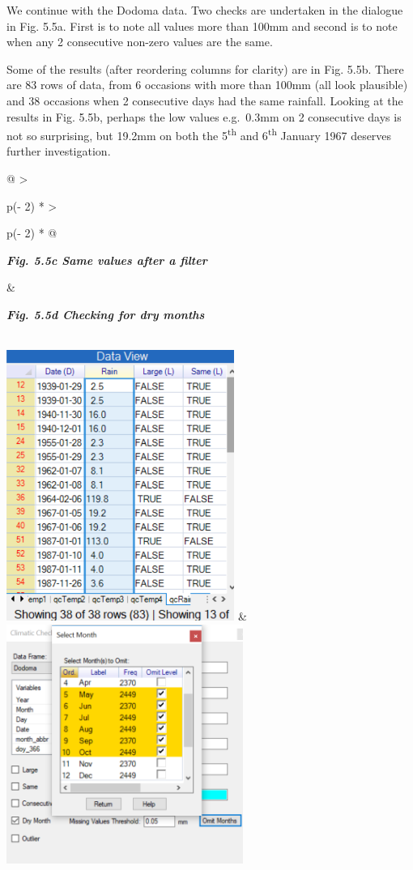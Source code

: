 \documentclass[
  letterpaper,
  DIV=11,
  numbers=noendperiod]{scrreprt}
\begin{document}
We continue with the Dodoma data. Two checks are undertaken in the
dialogue in Fig. 5.5a. First is to note all values more than 100mm and
second is to note when any 2 consecutive non-zero values are the same.

Some of the results (after reordering columns for clarity) are in Fig.
5.5b. There are 83 rows of data, from 6 occasions with more than 100mm
(all look plausible) and 38 occasions when 2 consecutive days had the
same rainfall. Looking at the results in Fig. 5.5b, perhaps the low
values e.g.~0.3mm on 2 consecutive days is not so surprising, but 19.2mm
on both the 5\textsuperscript{th} and 6\textsuperscript{th} January 1967
deserves further investigation.

\begin{longtable}[]{@{}
  >{\raggedright\arraybackslash}p{(\columnwidth - 2\tabcolsep) * }
  >{\raggedright\arraybackslash}p{(\columnwidth - 2\tabcolsep) * }@{}}
\toprule\noalign{}
\begin{minipage}[b]{\linewidth}\raggedright
\textbf{\emph{Fig. 5.5c Same values after a filter}}
\end{minipage} & \begin{minipage}[b]{\linewidth}\raggedright
\textbf{\emph{Fig. 5.5d Checking for dry months}}
\end{minipage} \\
\midrule\noalign{}
\endhead
\bottomrule\noalign{}
\endlastfoot
\includegraphics[width=2.93097in,height=3.47978in]{figures/Fig5.5c.png}
&
\includegraphics[width=3.04351in,height=3.07325in]{figures/Fig5.5d.png} \\
\end{longtable}
\end{document}
